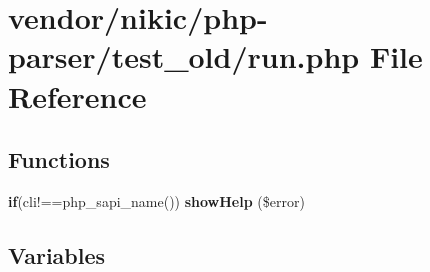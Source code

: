\section{vendor/nikic/php-\/parser/test\+\_\+old/run.php File Reference}
\label{run_8php}
\subsection*{Functions}
\begin{DoxyCompactItemize}
\item 
{\bf if}(\textquotesingle{}cli\textquotesingle{}!==php\+\_\+sapi\+\_\+name()) {\bf show\+Help} (\$error)
\end{DoxyCompactItemize}
\subsection*{Variables}
